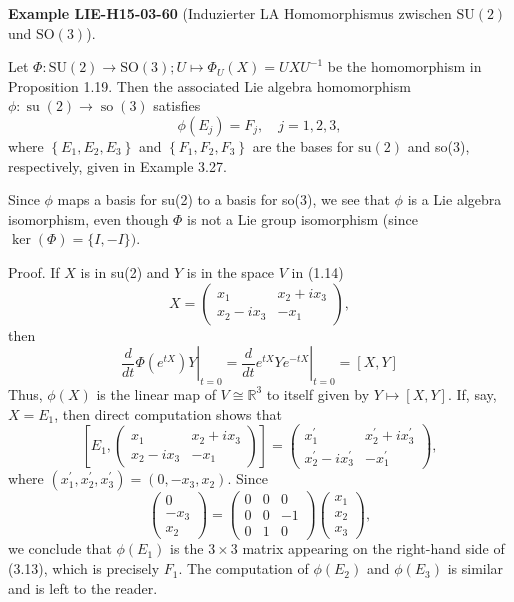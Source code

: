 \documentclass[10pt, letterpaper]{article}
\newcommand{\SO}{\mathrm{SO}}
\newcommand{\SU}{\mathrm{SU}}
\newcommand{\CustomHeading}[3]{%
  \par\medskip\noindent%
  \textbf{#1 #2} \textnormal{(#3)}.\enskip%
}
\newenvironment{EXA}[2]{\begin{unitbox}\CustomHeading{Example}{#1}{#2}}{\end{unitbox}}
\begin{document}
\begin{EXA}{LIE-H15-03-60}{Induzierter LA Homomorphismus zwischen $\SU(2)$ und $\SO(3)$}
Let $\Phi: \mathrm{SU}(2) \rightarrow \mathrm{SO}(3); U\mapsto \Phi_{U}(X)=U X U^{-1}$ be the homomorphism in Proposition 1.19. Then the associated Lie algebra homomorphism $\phi: \operatorname{su}(2) \rightarrow \operatorname{so}(3)$ satisfies
$$
\phi\left(E_{j}\right)=F_{j}, \quad j=1,2,3,
$$
where $\left\{E_{1}, E_{2}, E_{3}\right\}$ and $\left\{F_{1}, F_{2}, F_{3}\right\}$ are the bases for $\mathrm{su}(2)$ and so(3), respectively, given in Example 3.27.

Since $\phi$ maps a basis for su(2) to a basis for so(3), we see that $\phi$ is a Lie algebra isomorphism, even though $\Phi$ is not a Lie group isomorphism (since $\operatorname{ker}(\Phi)=\{I,-I\})$.

Proof. If $X$ is in su(2) and $Y$ is in the space $V$ in (1.14)
$$
X=\left(\begin{array}{cc}
x_{1} & x_{2}+i x_{3} \\
x_{2}-i x_{3} & -x_{1}
\end{array}\right),
$$
then
$$
\left.\frac{d}{d t} \Phi\left(e^{t X}\right) Y\right|_{t=0}=\left.\frac{d}{d t} e^{t X} Y e^{-t X}\right|_{t=0}=[X, Y]
$$
Thus, $\phi(X)$ is the linear map of $V \cong \mathbb{R}^{3}$ to itself given by $Y \mapsto[X, Y]$. If, say, $X=E_{1}$, then direct computation shows that
$$
\left[E_{1},\left(\begin{array}{cc}
x_{1} & x_{2}+i x_{3} \\
x_{2}-i x_{3} & -x_{1}
\end{array}\right)\right]=\left(\begin{array}{cc}
x_{1}^{\prime} & x_{2}^{\prime}+i x_{3}^{\prime} \\
x_{2}^{\prime}-i x_{3}^{\prime} & -x_{1}^{\prime}
\end{array}\right),
$$
where $\left(x_{1}^{\prime}, x_{2}^{\prime}, x_{3}^{\prime}\right)=\left(0,-x_{3}, x_{2}\right)$. Since
$$
\left(\begin{array}{c}
0 \\
-x_{3} \\
x_{2}
\end{array}\right)=\left(\begin{array}{rrr}
0 & 0 & 0 \\
0 & 0 & -1 \\
0 & 1 & 0
\end{array}\right)\left(\begin{array}{l}
x_{1} \\
x_{2} \\
x_{3}
\end{array}\right),
$$
we conclude that $\phi\left(E_{1}\right)$ is the $3 \times 3$ matrix appearing on the right-hand side of (3.13), which is precisely $F_{1}$. The computation of $\phi\left(E_{2}\right)$ and $\phi\left(E_{3}\right)$ is similar and is left to the reader.
\end{EXA}
\end{document}

